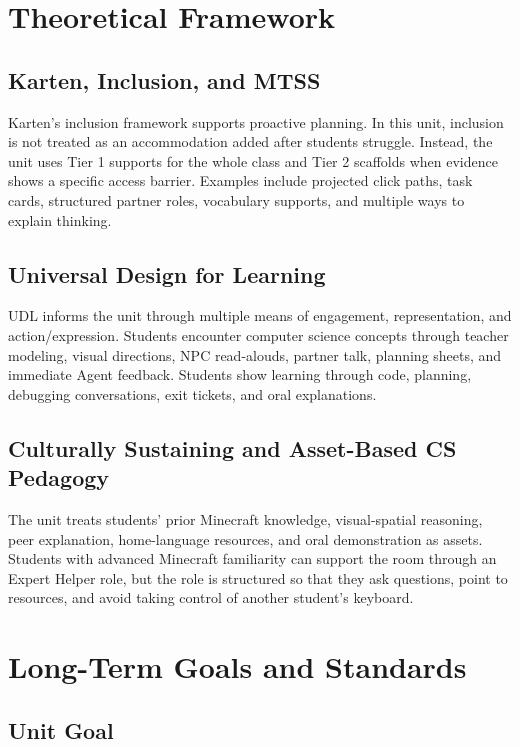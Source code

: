 \documentclass[12pt]{article}
\begin{document}
\section{Theoretical Framework}

\subsection{Karten, Inclusion, and MTSS}

Karten's inclusion framework supports proactive planning. In this unit, inclusion is not treated as an accommodation added after students struggle. Instead, the unit uses Tier 1 supports for the whole class and Tier 2 scaffolds when evidence shows a specific access barrier. Examples include projected click paths, task cards, structured partner roles, vocabulary supports, and multiple ways to explain thinking.

\subsection{Universal Design for Learning}

UDL informs the unit through multiple means of engagement, representation, and action/expression. Students encounter computer science concepts through teacher modeling, visual directions, NPC read-alouds, partner talk, planning sheets, and immediate Agent feedback. Students show learning through code, planning, debugging conversations, exit tickets, and oral explanations.

\subsection{Culturally Sustaining and Asset-Based CS Pedagogy}

The unit treats students' prior Minecraft knowledge, visual-spatial reasoning, peer explanation, home-language resources, and oral demonstration as assets. Students with advanced Minecraft familiarity can support the room through an Expert Helper role, but the role is structured so that they ask questions, point to resources, and avoid taking control of another student's keyboard.

\section{Long-Term Goals and Standards}

\subsection{Unit Goal}
\end{document}
